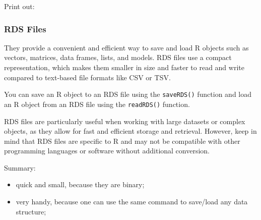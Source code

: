 \documentclass[
]{book}
\newenvironment{Shaded}{\begin{snugshade}}{\end{snugshade}}
\newcommand{\DecValTok}[1]{\textcolor[rgb]{0.00,0.00,0.81}{#1}}
\newcommand{\NormalTok}[1]{#1}
\newcommand{\SpecialCharTok}[1]{\textcolor[rgb]{0.81,0.36,0.00}{\textbf{#1}}}
\newcommand{\StringTok}[1]{\textcolor[rgb]{0.31,0.60,0.02}{#1}}
\providecommand{\tightlist}{%
  \setlength{\itemsep}{0pt}\setlength{\parskip}{0pt}}
\begin{document}
Print out:

\begin{Shaded}
\end{Shaded}

\hypertarget{rds-files}{%
\subsubsection{RDS Files}\label{rds-files}}

They provide a convenient and efficient way to save and load R objects such as vectors, matrices, data frames, lists, and models. RDS files use a compact representation, which makes them smaller in size and faster to read and write compared to text-based file formats like CSV or TSV.

You can save an R object to an RDS file using the \texttt{saveRDS()} function and load an R object from an RDS file using the \texttt{readRDS()} function.

RDS files are particularly useful when working with large datasets or complex objects, as they allow for fast and efficient storage and retrieval. However, keep in mind that RDS files are specific to R and may not be compatible with other programming languages or software without additional conversion.

Summary:

\begin{itemize}
\tightlist
\item
  quick and small, because they are binary;
\item
  very handy, because one can use the same command to save/load any data structure;
\end{itemize}
\end{document}
